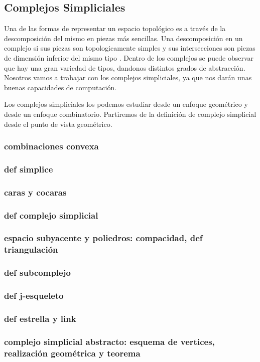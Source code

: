 \subsection{Complejos Simpliciales}
Una de las formas de representar un espacio topológico es a través de la descomposición del mismo en piezas más sencillas. Una descomposición en un complejo si sus piezas son topologicamente simples y sus intersecciones son piezas de dimensión inferior del mismo tipo \cite{EH}. Dentro de los complejos se puede observar que hay una gran variedad de tipos, dandonos distintos grados de abstracción. Nosotros vamos a trabajar con los complejos simpliciales, ya que nos darán unas buenas capacidades de computación.

Los complejos simpliciales los podemos estudiar desde un enfoque geométrico y desde un enfoque combinatorio. Partiremos de la definición de complejo simplicial desde el punto de vista geométrico.

\subsubsection*{combinaciones convexa}
\subsubsection*{def simplice}
\subsubsection*{caras y cocaras}
\subsubsection*{def complejo simplicial}
\subsubsection*{espacio subyacente y poliedros: compacidad, def triangulación}
\subsubsection*{def subcomplejo}
\subsubsection*{def j-esqueleto}
\subsubsection*{def estrella y link}
\subsubsection*{complejo simplicial abstracto: esquema de vertices, realización geométrica y teorema}
